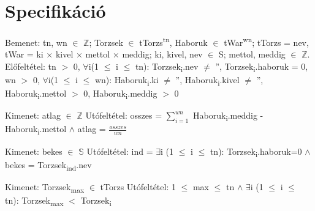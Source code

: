 \documentclass[12pt]{report}
\begin{document}
\section{Specifikáció}
Bemenet: tn, wn $\in$ $\mathbb{Z}$; Torzsek $\in$ tTorzs\textsuperscript{tn}, Haboruk $\in$ tWar\textsuperscript{wn}; tTorzs = nev, tWar = ki $\times$ kivel $\times$ mettol $\times$ meddig; ki, kivel, nev $\in$ S; mettol, meddig $\in$ $\mathbb{Z}$.
\newline
Előfeltétel: tn $>$ 0, $\forall$i(1 $\leq$ i $\leq$ tn): Torzsek\textsubscript{i}.nev $\not=$ '', Torzsek\textsubscript{i}.haboruk = 0,\newline
\-\hspace{1.85cm} wn $>$ 0, $\forall$i(1 $\leq$ i $\leq$ wn): Haboruk\textsubscript{i}.ki $\not=$ '',  Haboruk\textsubscript{i}.kivel $\not=$ '', Haboruk\textsubscript{i}.mettol $>$ 0, Haboruk\textsubscript{i}.meddig $>$ 0

\vspace{5mm}
\begin{Large}
\color{BlueB}{D feladat}
\end{Large}
\vspace{2mm}

Kimenet: atlag $\in$ $\mathbb{Z}$\newline
Utófeltétel: osszes =  $\sum\limits_{i=1}^{wn}$ Haboruk\textsubscript{i}.meddig - Haboruk\textsubscript{i}.mettol $\wedge$ atlag = $\frac{osszes}{wn}$

\vspace{5mm}
\begin{Large}
\color{BlueB}{R feladat}
\end{Large}
\vspace{2mm}

Kimenet: bekes $\in$ $\mathbb{S}$\newline
Utófeltétel: ind = $\exists$i (1 $\le$ i $\le$ tn): Torzsek\textsubscript{i}.haboruk=0 $\wedge$ bekes = Torzsek\textsubscript{ind}.nev

\vspace{5mm}
\begin{Large}
\color{BlueB}{BB feladat}
\end{Large}
\vspace{2mm}

Kimenet: Torzsek\textsubscript{max} $\in$ tTorzs\newline
Utófeltétel: 1 $\le$ max $\le$ tn $\wedge$ $\exists$i (1 $\le$ i $\le$ tn): Torzsek\textsubscript{max} $<$ Torzsek\textsubscript{i}
\end{document}
